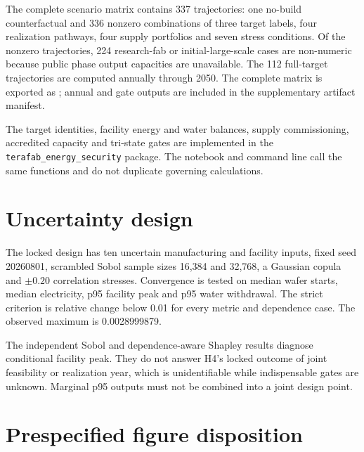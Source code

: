 \documentclass[11pt]{article}
\begin{document}
The complete scenario matrix contains 337 trajectories: one no-build
counterfactual and 336 nonzero combinations of three target labels, four
realization pathways, four supply portfolios and seven stress conditions. Of
the nonzero trajectories, 224 research-fab or initial-large-scale cases are
non-numeric because public phase output capacities are unavailable. The 112
full-target trajectories are computed annually through 2050. The complete
matrix is exported as
; annual and gate outputs are
included in the supplementary artifact manifest.

The target identities, facility energy and water balances, supply
commissioning, accredited capacity and tri-state gates are implemented in the
\texttt{terafab\_energy\_security} package. The notebook and command line call
the same functions and do not duplicate governing calculations.

\section{Uncertainty design}

The locked design has ten uncertain manufacturing and facility inputs, fixed
seed 20260801, scrambled Sobol sample sizes 16,384 and 32,768, a Gaussian copula
and $\pm0.20$ correlation stresses. Convergence is tested on median wafer
starts, median electricity, p95 facility peak and p95 water withdrawal. The
strict criterion is relative change below 0.01 for every metric and dependence
case. The observed maximum is 0.0028999879.

The independent Sobol and dependence-aware Shapley results diagnose
conditional facility peak. They do not answer H4's locked outcome of joint
feasibility or realization year, which is unidentifiable while indispensable
gates are unknown. Marginal p95 outputs must not be combined into a joint
design point.

\section{Prespecified figure disposition}
\end{document}

